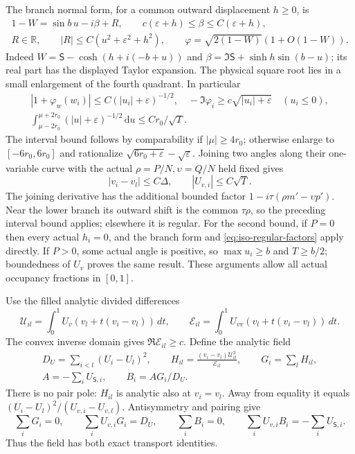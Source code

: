\documentclass[11pt]{article}
\numberwithin{equation}{section}
\theoremstyle{definition}
\newcommand{\dd}{\,\mathrm d}
\newcommand{\eps}{\varepsilon}
\begin{document}
The branch normal form, for a common outward displacement $h\ge0$,
is
\begin{equation}\label{eq:iso-branch-normal}
 \begin{gathered}
 1-W=\sin b\,u-i\beta+R,\qquad
 c(\eps+h)\le\beta\le C(\eps+h),\\
 R\in\mathbb R,\qquad |R|\le C(u^2+\eps^2+h^2),\qquad
 \varphi=\sqrt{2(1-W)}(1+O(1-W)).
 \end{gathered}
\end{equation}
Indeed $W=\mathsf S-\cosh(h+i(-b+u))$ and
$\beta=\Im\mathsf S+\sinh h\sin(b-u)$; its real part has the
displayed Taylor expansion.  The physical square root lies in a
small enlargement of the fourth quadrant.  In particular
\[
 \begin{gathered}
 |1+\varphi_w(w_i)|\le C(|u_i|+\eps)^{-1/2},\quad
 -\Im\varphi_i\ge c\sqrt{|u_i|+\eps}\quad(u_i\le0),\\
 \int_{\mu-2r_0}^{\mu+2r_0}(|u|+\eps)^{-1/2}\dd u
       \le Cr_0/\sqrt T.
 \end{gathered}
\]
The interval bound follows by comparability if $|\mu|\ge4r_0$;
otherwise enlarge to $[-6r_0,6r_0]$ and rationalize
$\sqrt{6r_0+\eps}-\sqrt\eps$.
Joining two angles along their one-variable curve with the actual
$\rho=P/N,\upsilon=Q/N$ held fixed gives
\begin{equation}\label{eq:iso-coordinate-scales}
 |v_i-v_l|\le C\Delta,\qquad |U_{v,i}|\le C\sqrt T.
\end{equation}
The joining derivative has the additional bounded factor
$1-i\tau(\rho m'-\upsilon p')$.  Near the lower branch its outward
shift is the common $\tau\rho$, so the preceding interval bound
applies; elsewhere it is regular.  For the second bound, if $P=0$
then every actual $h_i=0$, and the branch form and
\eqref{eq:iso-regular-factors} apply directly.  If $P>0$, some
actual angle is positive, so $\max u_i\ge b$ and $T\ge b/2$;
boundedness of $U_v$ proves the same result.  These arguments allow
all actual occupancy fractions in $[0,1]$.


Use the filled analytic divided differences
\[
 \mathcal U_{il}=\int_0^1U_v(v_l+t(v_i-v_l))\,dt,\qquad
 \mathcal E_{il}=\int_0^1U_{vv}(v_l+t(v_i-v_l))\,dt.
\]
The convex inverse domain gives $\Re\mathcal E_{il}\ge c$.
Define the analytic field
\begin{equation}\label{eq:iso-covariance-field}
 \begin{gathered}
 D_U=\sum_{i<l}(U_i-U_l)^2,\qquad
 H_{il}=\frac{(v_i-v_l)\mathcal U_{il}^2}{\mathcal E_{il}},
 \qquad G_i=\sum_lH_{il},\\
 A=-\sum_iU_{\mathsf S,i},\qquad B_i=AG_i/D_U.
 \end{gathered}
\end{equation}
There is no pair pole: $H_{il}$ is analytic also at $v_i=v_l$.
Away from equality it equals $(U_i-U_l)^2/(U_{v,i}-U_{v,l})$.
Antisymmetry and pairing give
\[
 \sum_iG_i=0,\qquad \sum_iU_{v,i}G_i=D_U,\qquad
 \sum_iB_i=0,\qquad \sum_iU_{v,i}B_i=-\sum_iU_{\mathsf S,i}.
\]
Thus the field has both exact transport identities.
\end{document}
